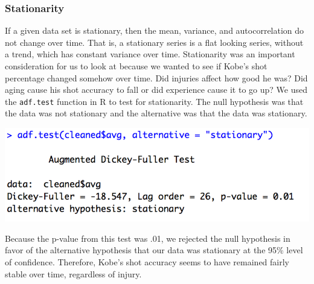 \documentclass[paper=a4, fontsize=11pt]{scrartcl} %
\numberwithin{equation}{section} %
\numberwithin{figure}{section} %
\numberwithin{table}{section} %
\begin{document}
\subsubsection{Stationarity}
\hspace*{1cm}If a given data set is stationary, then the mean, variance, and autocorrelation do not change over time. That is, a stationary series is a flat looking series, without a trend, which has constant variance over time. Stationarity was an important consideration for us to look at because we wanted to see if Kobe's shot percentage changed somehow over time. Did injuries affect how good he was? Did aging cause his shot accuracy to fall or did experience cause it to go up? We used the \texttt{adf.test} function in R to test for stationarity. The null hypothesis was that the data was not stationary and the alternative was that the data was stationary. 
\begin{center}
	\includegraphics[scale=0.65]{img/stationarity}
\end{center}
\hspace*{1cm}Because the p-value from this test was .01, we rejected the null hypothesis in favor of the alternative hypothesis that our data was stationary at the 95\% level of confidence. Therefore, Kobe's shot accuracy seems to have remained fairly stable over time, regardless of injury. 
\end{document}
